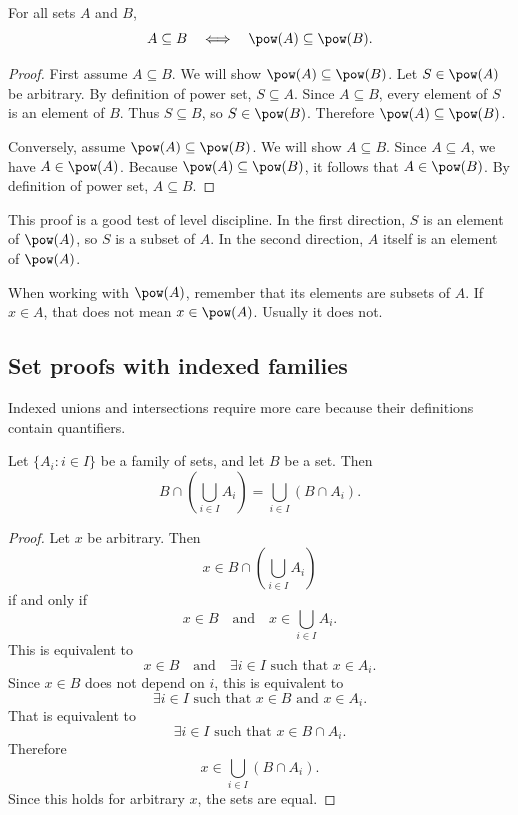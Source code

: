 \begin{theorem}
For all sets $A$ and $B$,
\[
A\subseteq B\quad\Longleftrightarrow\quad \pow(A)\subseteq\pow(B).
\]
\end{theorem}

\begin{proof}
First assume $A\subseteq B$. We will show $\pow(A)\subseteq\pow(B)$. Let $S\in\pow(A)$ be arbitrary. By definition of power set, $S\subseteq A$. Since $A\subseteq B$, every element of $S$ is an element of $B$. Thus $S\subseteq B$, so $S\in\pow(B)$. Therefore $\pow(A)\subseteq\pow(B)$.

Conversely, assume $\pow(A)\subseteq\pow(B)$. We will show $A\subseteq B$. Since $A\subseteq A$, we have $A\in\pow(A)$. Because $\pow(A)\subseteq\pow(B)$, it follows that $A\in\pow(B)$. By definition of power set, $A\subseteq B$.
\end{proof}

This proof is a good test of level discipline. In the first direction, $S$ is an element of $\pow(A)$, so $S$ is a subset of $A$. In the second direction, $A$ itself is an element of $\pow(A)$.

\begin{trapbox}
When working with $\pow(A)$, remember that its elements are subsets of $A$. If $x\in A$, that does not mean $x\in\pow(A)$. Usually it does not.
\end{trapbox}

\subsection{Set proofs with indexed families}

Indexed unions and intersections require more care because their definitions contain quantifiers.

\begin{theorem}
Let $\{A_i:i\in I\}$ be a family of sets, and let $B$ be a set. Then
\[
B\cap\left(\bigcup_{i\in I}A_i\right)=\bigcup_{i\in I}(B\cap A_i).
\]
\end{theorem}

\begin{proof}
Let $x$ be arbitrary. Then
\[
x\in B\cap\left(\bigcup_{i\in I}A_i\right)
\]
if and only if
\[
x\in B\quad\text{and}\quad x\in\bigcup_{i\in I}A_i.
\]
This is equivalent to
\[
x\in B\quad\text{and}\quad \exists i\in I\text{ such that }x\in A_i.
\]
Since $x\in B$ does not depend on $i$, this is equivalent to
\[
\exists i\in I\text{ such that }x\in B\text{ and }x\in A_i.
\]
That is equivalent to
\[
\exists i\in I\text{ such that }x\in B\cap A_i.
\]
Therefore
\[
x\in\bigcup_{i\in I}(B\cap A_i).
\]
Since this holds for arbitrary $x$, the sets are equal.
\end{proof}

